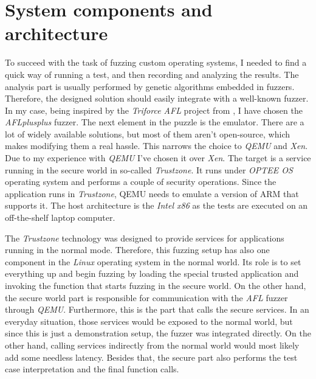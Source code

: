 \cleardoublepage
\section{System components and architecture} \label{chap:why}
To succeed with the task of fuzzing custom operating systems, I needed to find a quick way of running a test, and then recording and analyzing the results. The analysis part is usually performed by genetic algorithms embedded in fuzzers. Therefore, the designed solution should easily integrate with a well-known fuzzer. In my case, being inspired by the \textit{Triforce AFL} project from \cite{triforceafl}, I have chosen the \textit{AFLplusplus} fuzzer. The next element in the puzzle is the emulator. There are a lot of widely available solutions, but most of them aren't open-source, which makes modifying them a real hassle. This narrows the choice to \textit{QEMU} and \textit{Xen}. Due to my experience with \textit{QEMU} I've chosen it over \textit{Xen}. The target is a service running in the secure world in so-called \textit{Trustzone}. It runs under \textit{OPTEE OS} operating system and performs a couple of security operations. Since the application runs in \textit{Trustzone}, QEMU needs to emulate a version of ARM that supports it. The host architecture is the \textit{Intel x86} as the tests are executed on an off-the-shelf laptop computer. 

The \textit{Trustzone} technology was designed to provide services for applications running in the normal mode. Therefore, this fuzzing setup has also one component in the \textit{Linux} operating system in the normal world. Its role is to set everything up and begin fuzzing by loading the special trusted application and invoking the function that starts fuzzing in the secure world. On the other hand, the secure world part is responsible for communication with the \textit{AFL} fuzzer through \textit{QEMU}. Furthermore, this is the part that calls the secure services. In an everyday situation, those services would be exposed to the normal world, but since this is just a demonstration setup, the fuzzer was integrated directly. On the other hand, calling services indirectly from the normal world would most likely add some needless latency. Besides that, the secure part also performs the test case interpretation and the final function calls. 

